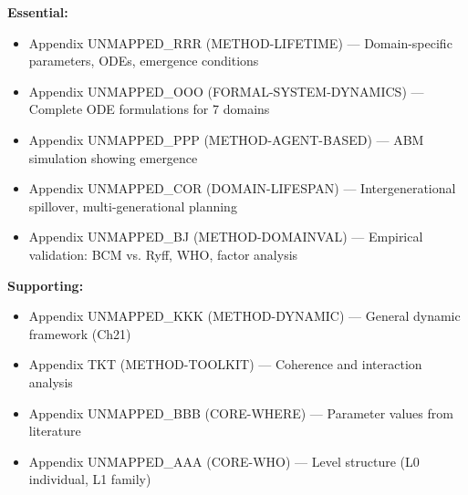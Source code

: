 
\begin{tcolorbox}[colback=yellow!10!white, colframe=orange!75!black, title=Appendix References]

\textbf{Essential:}
\begin{itemize}[nosep]
\item Appendix UNMAPPED_RRR (METHOD-LIFETIME) --- Domain-specific parameters, ODEs, emergence conditions
\item Appendix UNMAPPED_OOO (FORMAL-SYSTEM-DYNAMICS) --- Complete ODE formulations for 7 domains
\item Appendix UNMAPPED_PPP (METHOD-AGENT-BASED) --- ABM simulation showing emergence
\item Appendix UNMAPPED_COR (DOMAIN-LIFESPAN) --- Intergenerational spillover, multi-generational planning
\item Appendix UNMAPPED_BJ (METHOD-DOMAINVAL) --- Empirical validation: BCM vs. Ryff, WHO, factor analysis
\end{itemize}

\textbf{Supporting:}
\begin{itemize}[nosep]
\item Appendix UNMAPPED_KKK (METHOD-DYNAMIC) --- General dynamic framework (Ch21)
\item Appendix TKT (METHOD-TOOLKIT) --- Coherence and interaction analysis
\item Appendix UNMAPPED_BBB (CORE-WHERE) --- Parameter values from literature
\item Appendix UNMAPPED_AAA (CORE-WHO) --- Level structure (L0 individual, L1 family)
\end{itemize}

\end{tcolorbox}


